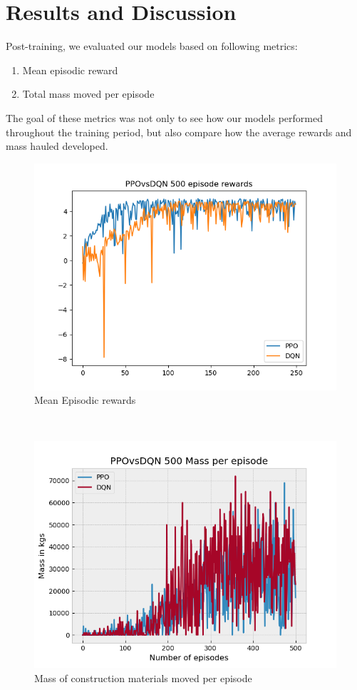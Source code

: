 \documentclass[conference]{IEEEtran}
\begin{document}
\section{Results and Discussion}
Post-training, we evaluated our models based on following metrics:
\begin{enumerate}
	\item Mean episodic reward
	\item Total mass moved per episode
\end{enumerate}
The goal of these metrics was not only to see how our models performed throughout the training period, but also compare how the average rewards and mass hauled developed.
\begin{figure}[h!]
	\includegraphics[width=\columnwidth]{graphs/PPOvsDQN250.png}
	\caption{Mean Episodic rewards}
\end{figure}
\\
\begin{figure}[h!]
	\includegraphics[width=\columnwidth]{graphs/PPOvsDQN500mass.png}
	\caption{Mass of construction materials moved per episode}
\end{figure}
\end{document}
